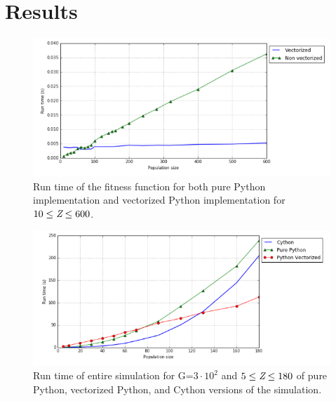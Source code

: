 \documentclass[10pt,a4paper]{article}
\begin{document}
\section{Results}
\begin{figure}[h!]
  \includegraphics[width=\linewidth]{Images/Vectorized_python_speedup.PNG}
  \caption{Run time of the fitness function for both pure Python implementation and vectorized Python implementation for $10 \leq \emph{Z} \leq 600$.}
  \label{fig:Runtime1}
\end{figure}

\begin{figure}[h!]
  \includegraphics[width=\linewidth]{Images/cython_python_vectorized_run_time.PNG}
  \caption{Run time of entire simulation for G=$3 \cdot 10^{2}$ and $5 \leq \emph{Z} \leq 180$ of pure Python, vectorized Python, and Cython versions of the simulation.}
  \label{fig:Runtime1}
\end{figure}
\end{document}
